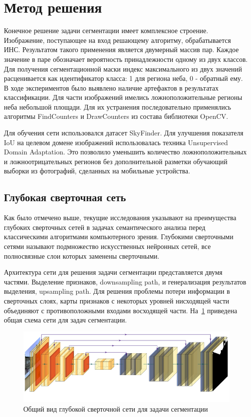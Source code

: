 \section{Метод решения}

Конечное решение задачи сегментации имеет комплексное строение.
Изображение, поступающее на вход решающему алгоритму, обрабатывается ИНС.
Результатом такого применения является двумерный массив пар.
Каждое значение в паре обозначает вероятность принадлежности одному из двух классов.
Для получения сегментационной маски индекс максимального из двух значений расценивается как идентификатор класса: 1 для региона неба, 0 - обратный ему.
В ходе экспериментов было выявлено наличие артефактов в результатах классификации.
Для части изображений имелись ложноположительные регионы неба небольшой площади.
Для их устранения последовательно применялись алгоритмы FindCounters и DrawCounters из состава библиотеки OpenCV.

Для обучения сети использовался датасет SkyFinder.
Для улучшения показателя IoU на целевом домене изображений использовалась техника Unsupervised Domain Adaptation.
Это позволило уменьшить количество ложноположительных и ложноотрицательных регионов без дополнительной разметки обучающий выборки из фотографий,
сделанных на мобильные устройства.

\subsection{Глубокая сверточная сеть}

Как было отмечено выше, текущие исследования указывают на преимущества глубоких сверточных сетей в задачах семантического анализа
перед классическими алгоритмами компьютерного зрения.
Глубокими сверточными сетями называют подмножество искусственных нейронных сетей, все полносвязные слои которых заменены сверточными.

Архитектура сети для решения задачи сегментации представляется двумя частями.
Выделение признаков, downsampling path, и генерализация результатов выделения, upsampling path.
Для решения проблемы потери информации в сверточных слоях, карты признаков с некоторых уровней нисходящей части объединяют с противоположными входами восходящей части.
На~\ref{fig:net_arch_common} приведена общая схема сети для задач сегментации.

\begin{figure}[H]
    \centering
    \includegraphics[width=\textwidth]{img/net_arch.png}
    \caption{Общий вид глубокой сверточной сети для задачи сегментации}
    \label{fig:net_arch_common}
\end{figure}

